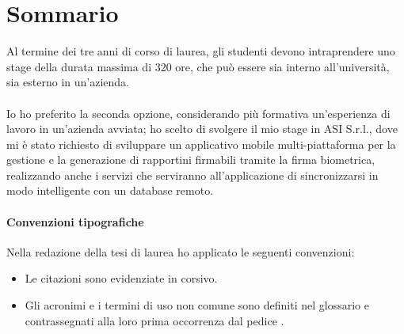 \cleardoublepage
{}
{}
\begingroup
\let\clearpage\relax
\let\cleardoublepage\relax
\let\cleardoublepage\relax

\chapter*{Sommario}
Al termine dei tre anni di corso di laurea, gli studenti devono intraprendere uno stage della durata massima di 320 ore, che può essere sia interno all'università, sia esterno in un'azienda.
\\
\\
Io ho preferito la seconda opzione, considerando più formativa un'esperienza di lavoro in un'azienda avviata; ho scelto di svolgere il mio stage in ASI S.r.l., dove mi è stato richiesto di sviluppare un applicativo mobile multi-piattaforma per la gestione e la generazione di rapportini firmabili tramite la firma biometrica, realizzando anche i servizi che serviranno all'applicazione di sincronizzarsi in modo intelligente con un database remoto.

\subsubsection*{Convenzioni tipografiche}
Nella redazione della tesi di laurea ho applicato le seguenti convenzioni:
\begin{itemize}
	\item Le citazioni sono evidenziate in corsivo.
	\item Gli acronimi e i termini di uso non comune sono definiti nel glossario e contrassegnati alla loro prima occorrenza dal pedice . 
\end{itemize} 


%
%

\endgroup			

\vfill


